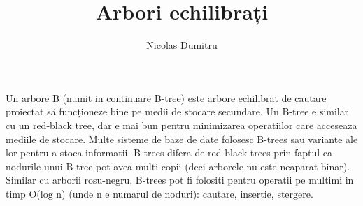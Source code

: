 \documentclass{article}
\title{Arbori echilibrați}
\author{Nicolas Dumitru}
\theoremstyle{definition}
\begin{document}
\maketitle

Un arbore B (numit in continuare B-tree) este arbore echilibrat de cautare
proiectat să funcționeze bine pe medii de stocare secundare. Un B-tree e similar
cu un red-black tree, dar e mai bun pentru minimizarea operatiilor care
acceseaza mediile de stocare. Multe sisteme de baze de date folosesc B-trees sau
variante ale lor pentru a stoca informatii.
B-trees difera de red-black trees prin faptul ca nodurile unui B-tree pot avea
multi copii (deci arborele nu este neaparat binar). Similar cu arborii
rosu-negru, B-trees pot fi folositi pentru operatii pe multimi in timp O(log n)
(unde n e numarul de noduri): cautare, insertie, stergere.
\end{document}
